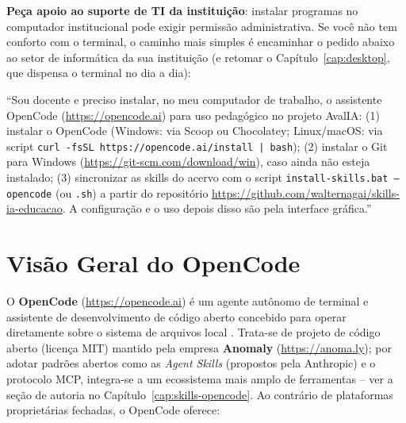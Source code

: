 \begin{atencaopedagogica}
\textbf{Pe{\c c}a apoio ao suporte de TI da institui{\c c}{\~a}o}: instalar programas no computador institucional pode exigir permiss{\~a}o administrativa. Se voc{\^e} n{\~a}o tem conforto com o terminal, o caminho mais simples {\'e} encaminhar o pedido abaixo ao setor de inform{\'a}tica da sua institui{\c c}{\~a}o (e retomar o Cap{\'i}tulo~\ref{cap:desktop}, que dispensa o terminal no dia a dia):
\begin{center}
\begin{tcolorbox}[colback=white, colframe=boxborder, arc=1mm, title={Texto pronto para enviar ao suporte de TI}]
\small
``Sou docente e preciso instalar, no meu computador de trabalho, o assistente OpenCode (\url{https://opencode.ai}) para uso pedag{\'o}gico no projeto AvalIA: (1) instalar o OpenCode (Windows: via Scoop ou Chocolatey; Linux/macOS: via script \texttt{curl -fsSL https://opencode.ai/install | bash}); (2) instalar o Git para Windows (\url{https://git-scm.com/download/win}), caso ainda n{\~a}o esteja instalado; (3) sincronizar as skills do acervo com o script \texttt{install-skills.bat --opencode} (ou \texttt{.sh}) a partir do reposit{\'o}rio \url{https://github.com/walternagai/skills-ia-educacao}. A configura{\c c}{\~a}o e o uso depois disso s{\~a}o pela interface gr{\'a}fica.''
\end{tcolorbox}
\end{center}
\end{atencaopedagogica}

\section{Vis{\~a}o Geral do OpenCode}

O \textbf{OpenCode} (\url{https://opencode.ai}) {\'e} um agente aut{\^o}nomo de terminal e assistente de desenvolvimento de c{\'o}digo aberto concebido para operar diretamente sobre o sistema de arquivos local \cite{opencode2026doc}. Trata-se de projeto de c{\'o}digo aberto (licen{\c c}a MIT) mantido pela empresa \textbf{Anomaly} (\url{https://anoma.ly}); por adotar padr{\~o}es abertos como as \emph{Agent Skills} (propostos pela Anthropic) e o protocolo MCP, integra-se a um ecossistema mais amplo de ferramentas -- ver a se{\c c}{\~a}o de autoria no Cap{\'i}tulo~\ref{cap:skills-opencode}. Ao contr{\'a}rio de plataformas propriet{\'a}rias fechadas, o OpenCode oferece:

